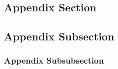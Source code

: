 \begin{appendices}
\clearpage
{}	

\section{Appendix Section}
\lipsum

\subsection{Appendix Subsection}
\lipsum

\subsubsection{Appendix Subsubsection}
\lipsum


\end{appendices}
